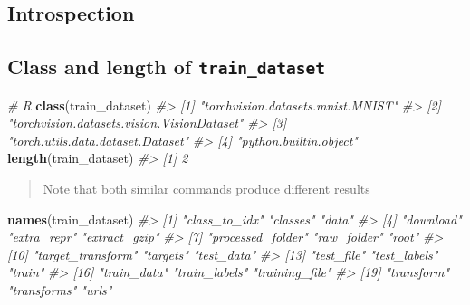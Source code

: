 \documentclass[]{book}
\newenvironment{Shaded}{\begin{snugshade}}{\end{snugshade}}
\newcommand{\CommentTok}[1]{\textcolor[rgb]{0.56,0.35,0.01}{\textit{#1}}}
\newcommand{\KeywordTok}[1]{\textcolor[rgb]{0.13,0.29,0.53}{\textbf{#1}}}
\newcommand{\NormalTok}[1]{#1}
\newcommand{\OperatorTok}[1]{\textcolor[rgb]{0.81,0.36,0.00}{\textbf{#1}}}
\begin{document}
\hypertarget{introspection}{%
\subsection{Introspection}\label{introspection}}

\hypertarget{class-and-length-of-train_dataset}{%
\subsection{\texorpdfstring{Class and length of \texttt{train\_dataset}}{Class and length of train\_dataset}}\label{class-and-length-of-train_dataset}}

\begin{Shaded}
\begin{Highlighting}[]
\CommentTok{# R}
\KeywordTok{class}\NormalTok{(train_dataset)}
\CommentTok{#> [1] "torchvision.datasets.mnist.MNIST"         }
\CommentTok{#> [2] "torchvision.datasets.vision.VisionDataset"}
\CommentTok{#> [3] "torch.utils.data.dataset.Dataset"         }
\CommentTok{#> [4] "python.builtin.object"}
\KeywordTok{length}\NormalTok{(train_dataset)}
\CommentTok{#> [1] 2}
\end{Highlighting}
\end{Shaded}

\begin{Shaded}
\end{Shaded}

\begin{quote}
Note that both similar commands produce different results
\end{quote}

\begin{Shaded}
\begin{Highlighting}[]
\KeywordTok{names}\NormalTok{(train_dataset)}
\CommentTok{#>  [1] "class_to_idx"     "classes"          "data"            }
\CommentTok{#>  [4] "download"         "extra_repr"       "extract_gzip"    }
\CommentTok{#>  [7] "processed_folder" "raw_folder"       "root"            }
\CommentTok{#> [10] "target_transform" "targets"          "test_data"       }
\CommentTok{#> [13] "test_file"        "test_labels"      "train"           }
\CommentTok{#> [16] "train_data"       "train_labels"     "training_file"   }
\CommentTok{#> [19] "transform"        "transforms"       "urls"}
\end{Highlighting}
\end{Shaded}
\end{document}
